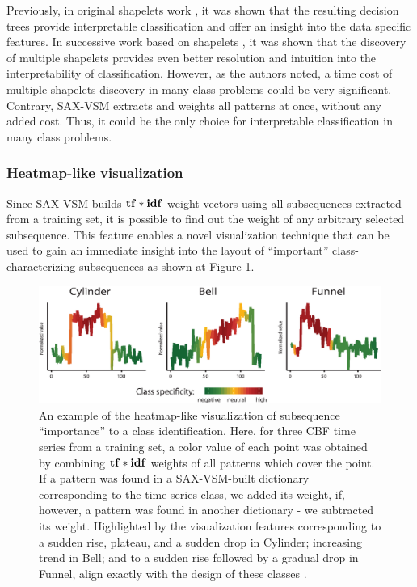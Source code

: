 Previously, in original shapelets work \cite{citeulike:7344347, citeulike:11957982}, it was shown that the 
resulting decision trees provide interpretable classification and offer an insight into the data
specific features. In successive work based on shapelets \cite{citeulike:11345338}, it was shown that
the discovery of multiple shapelets provides even better resolution and intuition into 
the interpretability of classification. 
However, as the authors noted, a time cost of multiple shapelets discovery
in many class problems could be very significant. 
Contrary, SAX-VSM extracts and weights all patterns at once, without any added cost. Thus, it could
be the only choice for interpretable classification in many class problems.

\subsubsection{Heatmap-like visualization}
Since SAX-VSM builds $\text{\textbf{tf}}\ast\text{\textbf{idf}}$ weight vectors using all subsequences extracted from a
training set, it is possible to find out the weight of any arbitrary selected subsequence.
This feature enables a novel visualization technique that can be used to gain an immediate
insight into the layout of ``important'' class-characterizing subsequences as shown at Figure
\ref{fig:heat}.

\begin{figure}[ht]
   \centering
   \includegraphics[width=120mm]{figures/CBF-HEAT.eps}
   \caption{An example of the heatmap-like visualization of subsequence ``importance''
   to a class identification. 
   Here, for three CBF time series from a training set, a color value 
   of each point was obtained by combining $\text{\textbf{tf}}\ast\text{\textbf{idf}}$ weights of all patterns 
   which cover the point.
   If a pattern was found in a SAX-VSM-built dictionary corresponding to the 
   time-series class, we added its weight, if, however, a pattern was found in 
   another dictionary - we subtracted its weight. Highlighted by the visualization 
   features corresponding to a sudden rise, plateau, and a sudden drop in Cylinder;
   increasing trend in Bell;
   and to a sudden rise followed by a gradual drop in Funnel, align exactly with the
   design of these classes \cite{citeulike:12563781}.}
   \label{fig:heat}
\end{figure}

